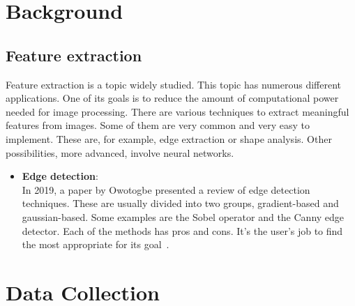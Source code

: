 \documentclass[conference]{IEEEtran}
\begin{document}



\section{Background}

	\subsection{Feature extraction}

		Feature extraction is a topic widely studied. 
		This topic has numerous different applications. 
		One of its goals is to reduce the amount of computational power needed for image processing. 
		There are various techniques to extract meaningful features from images. 
		Some of them are very common and very easy to implement. 
		These are, for example, edge extraction or shape analysis. 
		Other possibilities, more advanced, involve neural networks.\\

		\begin{itemize}
			
			\item \textbf{Edge detection}:\\				
				In 2019, a paper by Owotogbe presented a review of edge detection techniques. 
				These are usually divided into two groups, gradient-based and gaussian-based. 
				Some examples are the Sobel operator and the Canny edge detector. 
				Each of the methods has pros and cons. 
				It's the user's job to find the most appropriate for its goal~\cite{1}.
			
		\end{itemize}

\section{Data Collection}
\end{document}
